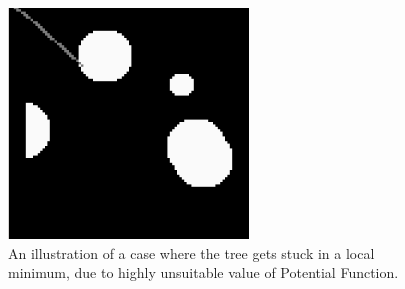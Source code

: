 \documentclass[runningheads]{llncs}
\begin{document}
\begin{figure}
\begin{center}
\includegraphics[scale=0.65]{stuck.png}
    \caption{ An illustration of a case where the tree gets stuck in a local minimum, due to highly unsuitable value of Potential Function.}\label{fig1}
\end{center}
\end{figure}
\end{document}
